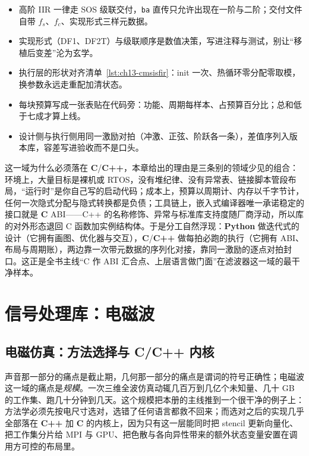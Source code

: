 \documentclass[12pt,a4paper,fontset=fandol]{ctexbook}
\newcommand{\Tp}[1]{\texttt{#1}}
\newcommand{\Bk}{\allowbreak}
\newcommand{\Lang}[1]{\textsf{\bfseries #1}}
\newcommand{\CL}{\Lang{C}}
\newcommand{\CPP}{\Lang{C++}}
\newcommand{\PY}{\Lang{Python}}
\begin{document}
\begin{bestpractice}[title={本章的落地清单}]
\begin{itemize}
\item 高阶 IIR 一律走 SOS 级联交付，\Tp{ba} 直传只允许出现在一阶与二阶；交付文件自带 $f_s$、$f_c$、实现形式三样元数据。
\item 实现形式（DF1、DF2T）与级联顺序是数值决策，写进注释与测试，别让``移植后变差''沦为玄学。
\item 执行层的形状对齐清单~\ref{lst:ch13-cmsisfir}：init 一次、热循环零分配零取模，换参数永远走重配加清状态。
\item 每块预算写成一张表贴在代码旁：功能、周期每样本、占预算百分比；总和低于七成才算上线。
\item 设计侧与执行侧用同一激励对拍（冲激、正弦、阶跃各一条），差值序列入版本库，容差写进验收而不是口头。
\end{itemize}
\end{bestpractice}

这一域为什么必须落在 \CL{}/{\Bk}\CPP{}，本章给出的理由是三条别的领域少见的组合：环境上，大量目标是裸机或 RTOS，没有堆纪律、没有异常表、链接脚本管段布局，``运行时''是你自己写的启动代码；成本上，预算以周期计、内存以千字节计，任何一次隐式分配与隐式转换都是负债；工具链上，嵌入式编译器唯一承诺稳定的接口就是 \CL{} ABI——C++ 的名称修饰、异常与标准库支持度随厂商浮动，所以库的对外形态退回 C 函数加实例结构体。于是分工自然浮现：\PY{} 做迭代式的设计（它拥有画图、优化器与交互），\CL{}/{\Bk}\CPP{} 做每拍必跑的执行（它拥有 ABI、布局与周期账），两边靠一次带元数据的序列化对接，靠同一激励的逐点对拍封口。这正是全书主线``C 作 ABI 汇合点、上层语言做门面''在滤波器这一域的最干净样本。

\part{信号处理库：电磁波}

\chapter{电磁仿真：方法选择与 C/C++ 内核}

声音那一部分的痛点是截止期，几何那一部分的痛点是谓词的符号正确性；电磁波这一域的痛点是\emph{规模}。一次三维全波仿真动辄几百万到几亿个未知量、几十 GB 的工作集、跑几十分钟到几天。这个规模把本册的主线推到一个很干净的例子上：方法学必须先按电尺寸选对，选错了任何语言都救不回来；而选对之后的实现几乎全部落在 \CPP{} 加 \CL{} 的内核上，因为只有这一层能同时把 stencil 更新向量化、把工作集分片给 MPI 与 GPU、把色散与各向异性带来的额外状态变量安置在调用方可控的布局里。
\end{document}
